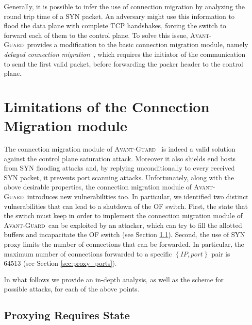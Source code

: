 \documentclass{sig-alternate}
\newcommand{\avantguard}{\textsc{Avant-Guard}}
\begin{document}
Generally, it is possible to infer the use of connection migration by analyzing the round trip time of a SYN packet. 
An adversary might use this information to flood the data plane with complete TCP handshakes, 
forcing the switch to forward each of them to the control plane.
To solve this issue, \avantguard~provides a modification to the basic connection migration module, 
namely {\em delayed connection migration}~\cite{AvantGuard}, which requires the initiator of the 
communication to send the first valid packet, before forwarding the packer header to the control plane.









\section{Limitations of the Connection Migration module}\label{sec:connection_migration_analysis}

The connection migration module of \avantguard~\cite{AvantGuard} is indeed a valid solution against the control plane saturation attack. 
Moreover it also shields end hosts from SYN flooding attacks and, by replying unconditionally to every received SYN packet, it prevents port scanning attacks.
Unfortunately, along with the above desirable properties, the connection migration module of \avantguard~introduces new vulnerabilities too. 
In particular, we identified two distinct vulnerabilities that can lead to a shutdown of the OF switch.
First, the state that the switch must keep in order to implement the connection migration module of \avantguard~can be exploited by an attacker, which can try to fill the allotted buffers and incapacitate the OF switch (see Section \ref{sec:proxying_needs_state}). Second, the use of SYN proxy limits the number of connections that can be forwarded. In particular, the maximum number of connections forwarded to a specific $\left\{ {IP, port } \right\}$ pair is $64513$ (see Section \ref{sec:proxy_ports}).

In what follows we provide an in-depth analysis, as well as the scheme for possible attacks, for each of the above points.

\subsection{Proxying Requires State}\label{sec:proxying_needs_state}
\end{document}
